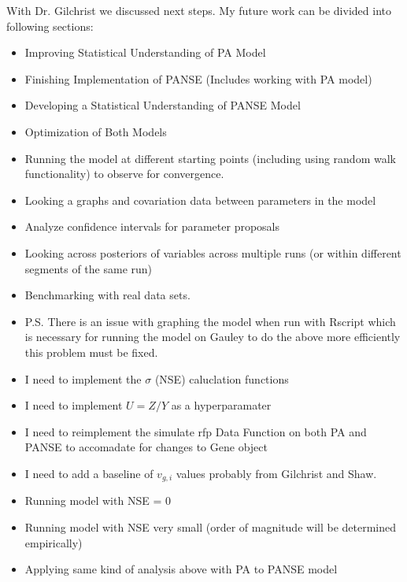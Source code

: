 \documentclass[12pt,hyperref]{labbook}
\begin{document}
With Dr. Gilchrist we discussed next steps. My future work can be divided into following sections:
\begin{itemize}
 \item Improving Statistical Understanding of PA Model
 \item Finishing Implementation of PANSE (Includes working with PA model)
 \item Developing a Statistical Understanding of PANSE Model
 \item Optimization of Both Models
\end{itemize}
\begin{itemize}
 \item Running the model at different starting points (including using random walk functionality) to observe for convergence.
 \item Looking a graphs and covariation data between parameters in the model
 \item Analyze confidence intervals for parameter proposals
 \item Looking across posteriors of variables across multiple runs (or within different segments of the same run)
 \item Benchmarking with real data sets.
 \item P.S. There is an issue with graphing the model when run with Rscript which is necessary for running the model on Gauley
 to do the above more efficiently this problem must be fixed.
\end{itemize}
\begin{itemize}
 \item I need to implement the $\sigma$ (NSE) caluclation functions
 \item I need to implement $U = Z/Y$ as a hyperparamater
 \item I need to reimplement the simulate rfp Data Function on both PA and PANSE to accomadate for changes to Gene object
 \item I need to add a baseline of $v_{g,i}$ values probably from Gilchrist and Shaw.
\end{itemize}
\begin{itemize}
 \item Running model with NSE = 0
 \item Running model with NSE very small (order of magnitude will be determined empirically)
 \item Applying same kind of analysis above with PA to PANSE model
\end{itemize}
\end{document}
